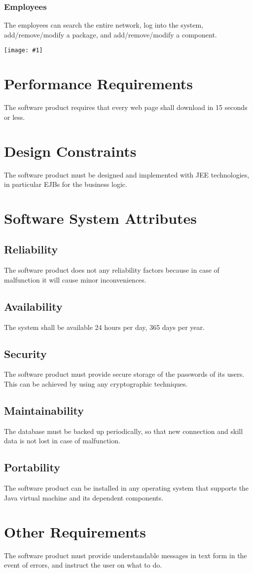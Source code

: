 \documentclass[a4paper,12pt]{book}
\newcommand{\putimg}[2]{
  \begin{center}
    \texttt{[image: \#1]}
  \end{center}
}
\begin{document}
\subsubsection{Employees}
The employees can search the entire network, log into the system, add/remove/modify a package, and add/remove/modify a component.
\putimg{uc-employee}{0.4}

\section{Performance Requirements}
The software product requires that every web page shall download in 15 seconds or less.

\section{Design Constraints}
The software product must be designed and implemented with JEE technologies, in particular EJBs for the business logic.

\section{Software System Attributes}

\subsection{Reliability}
The software product does not any reliability factors because in case of malfunction it will cause minor inconveniences.

\subsection{Availability}
The system shall be available 24 hours per day, 365 days per year.

\subsection{Security}
The software product must provide secure storage of the passwords of its users. This can be achieved by using any cryptographic techniques.

\subsection{Maintainability}
The database must be backed up periodically, so that new connection and skill data is not lost in case of malfunction.

\subsection{Portability}
The software product can be installed in any operating system that supports the Java virtual machine and its dependent components.

\section{Other Requirements}
The software product must provide understandable messages in text form in the event of errors, and instruct the user on what to do.
\end{document}
